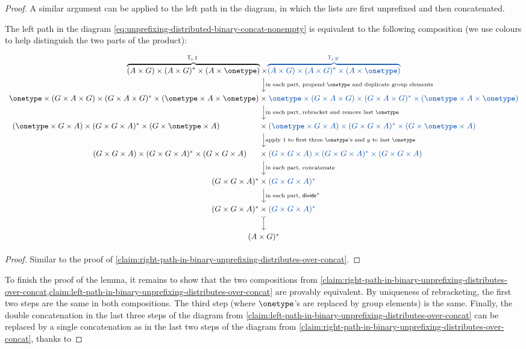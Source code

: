 \begin{proof}
A similar argument can be applied to  the left path in the diagram, in which the lists are first unprefixed and then concatenated.
\begin{claim}\label{claim:left-path-in-binary-unprefixing-distributes-over-concat}
    The left path in the diagram \eqref{eq:unprefixing-distributed-binary-concat-nonempty} is equivalent to the following composition (we use colours to help distinguish the two parts of the product):
    \[
\begin{tikzcd}
\myoverbrace{(A \times G) \times (A \times G)^* \times (A \times \onetype)}{$\functorplus \groupid$} \times 
\blue{\myoverbrace{(A \times G) \times (A \times G)^* \times (A \times \onetype)}{$ \functorplus g$}}
\ar[d,"\text{in each part, prepend $\onetype$ and duplicate group elements}"]
\\
\onetype \times (G \times A \times G) \times (G \times A \times G)^* \times (\onetype \times A \times \onetype) \times \blue{\onetype \times  (G \times A \times G) \times (G \times A \times G)^* \times (\onetype \times A \times \onetype)}
\ar[d,"\text{in each part, rebracket and remove last $\onetype$}"]
\\
(\onetype \times G \times A) \times (G \times G \times A)^* \times (G  \times \onetype  \times A)  \phantom{ \times \onetype}  \times \blue{(\onetype \times G \times A) \times (G \times G \times A)^* \times (G \times \onetype \times A) \phantom{\times \onetype}}
\ar[d,"\text{apply $\groupid$ to first three $\onetype$'s and $g$ to last  $\onetype$}"]
\\
(G \times G \times A) \times (G \times G \times A)^* \times (G  \times G  \times A) \phantom{\times G} \times \blue{(G \times G \times A) \times (G \times G \times A)^* \times (G \times G \times A)}
\phantom{ \times G}
\ar[d,"\text{in each part, concatenate}"]
\\
( G \times G \times A)^* \times \blue{( G \times G \times A)^*}
\ar[d,"\text{in each part, $\groupdiv^*$}"]
\\
( G \times G \times A)^* \times \blue{( G \times G \times A)^*}
\ar[d,\concar] 
\\
(A \times G)^*
\end{tikzcd}
\]
\end{claim}
\begin{proof}
    Similar to the proof of \cref{claim:right-path-in-binary-unprefixing-distributes-over-concat}.
\end{proof}
To finish the proof of the lemma, it remains to show that the two compositions from \cref{claim:right-path-in-binary-unprefixing-distributes-over-concat,claim:left-path-in-binary-unprefixing-distributes-over-concat} are provably equivalent. By uniqueness of rebracketing, the first two steps are the same in both compositions. The third step (where $\onetype$'s are replaced by group elements) is the same. Finally, the double concatenation in the last three steps of the diagram from \cref{claim:left-path-in-binary-unprefixing-distributes-over-concat} can be replaced by a   single concatenation as in the last two steps of the diagram from \cref{claim:right-path-in-binary-unprefixing-distributes-over-concat}, thanks to

\end{proof}
